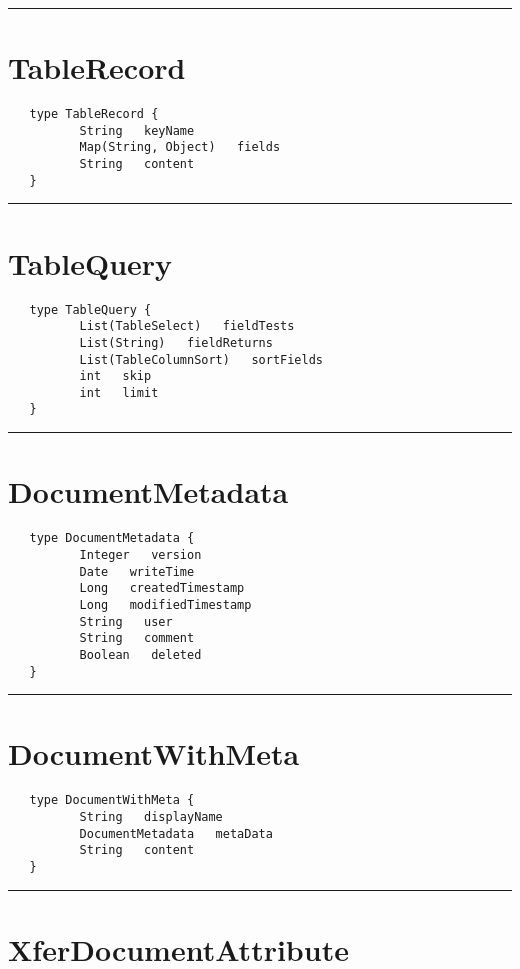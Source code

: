 \rule{12cm}{2pt}
\section{TableRecord}
\label{type:TableRecord}

\begin{Verbatim}
   type TableRecord {
          String   keyName
          Map(String, Object)   fields
          String   content
   }
\end{Verbatim}

\rule{12cm}{2pt}
\section{TableQuery}
\label{type:TableQuery}

\begin{Verbatim}
   type TableQuery {
          List(TableSelect)   fieldTests
          List(String)   fieldReturns
          List(TableColumnSort)   sortFields
          int   skip
          int   limit
   }
\end{Verbatim}

\rule{12cm}{2pt}
\section{DocumentMetadata}
\label{type:DocumentMetadata}

\begin{Verbatim}
   type DocumentMetadata {
          Integer   version
          Date   writeTime
          Long   createdTimestamp
          Long   modifiedTimestamp
          String   user
          String   comment
          Boolean   deleted
   }
\end{Verbatim}

\rule{12cm}{2pt}
\section{DocumentWithMeta}
\label{type:DocumentWithMeta}

\begin{Verbatim}
   type DocumentWithMeta {
          String   displayName
          DocumentMetadata   metaData
          String   content
   }
\end{Verbatim}

\rule{12cm}{2pt}
\section{XferDocumentAttribute}
\label{type:XferDocumentAttribute}

